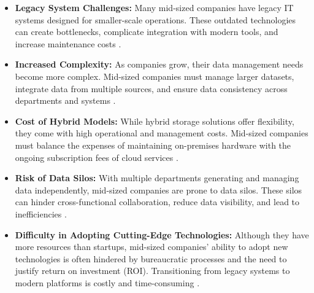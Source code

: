 \documentclass{article}
\begin{document}
\begin{itemize}
    \item \textbf{Legacy System Challenges:} Many mid-sized companies have legacy IT systems designed for smaller-scale operations. These outdated technologies can create bottlenecks, complicate integration with modern tools, and increase maintenance costs \cite{brown2018hidden}.
    
    \item \textbf{Increased Complexity:} As companies grow, their data management needs become more complex. Mid-sized companies must manage larger datasets, integrate data from multiple sources, and ensure data consistency across departments and systems \cite{deloitte2020complexity}.
    
    \item \textbf{Cost of Hybrid Models:} While hybrid storage solutions offer flexibility, they come with high operational and management costs. Mid-sized companies must balance the expenses of maintaining on-premises hardware with the ongoing subscription fees of cloud services \cite{techrepublic2021hybrid}.
    
    \item \textbf{Risk of Data Silos:} With multiple departments generating and managing data independently, mid-sized companies are prone to data silos. These silos can hinder cross-functional collaboration, reduce data visibility, and lead to inefficiencies \cite{hbr2018silos}.
    
    \item \textbf{Difficulty in Adopting Cutting-Edge Technologies:} Although they have more resources than startups, mid-sized companies' ability to adopt new technologies is often hindered by bureaucratic processes and the need to justify return on investment (ROI). Transitioning from legacy systems to modern platforms is costly and time-consuming \cite{accenture2019adoption}.
\end{itemize}





\end{document}
